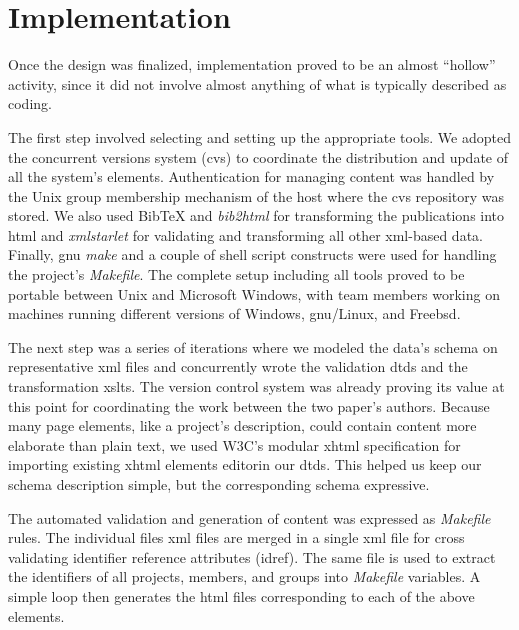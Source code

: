 \documentclass[10pt]{article}
\begin{document}
\section{Implementation}
Once the design was finalized,
implementation proved to be an almost ``hollow'' activity,
since it did not involve almost anything of what
is typically described as coding.

The first step involved selecting and setting up the
appropriate tools.
We adopted the concurrent versions system
({\sc cvs}) \cite{BF01} to coordinate the distribution
and update of all the system's elements.
Authentication for managing content was handled by the
Unix group membership mechanism of the host where the
{\sc cvs} repository was stored.
We also used
BibTeX and {\em bib2html} for transforming the publications
into {\sc html} and
{\em xmlstarlet} \cite{Gru04} for validating and transforming
all other {\sc xml}-based data.
Finally, {\sc gnu} {\em make} and a couple of shell script
constructs were used for handling the project's {\em Makefile}.
The complete setup including all tools proved to be portable
between Unix and Microsoft Windows, with team members working
on machines running different versions of Windows, {\sc gnu}/Linux,
and Free{\sc bsd}.

The next step was a series of iterations where we
modeled the data's schema on representative {\sc xml}
files and concurrently wrote the validation {\sc dtd}s
and the transformation {\sc xslt}s.
The version control system was already proving its value
at this point
for coordinating the work between the two paper's authors.
Because many page elements, like a project's description,
could contain content more elaborate than plain text,
we used W3C's modular {\sc xhtml} specification for
importing existing {\sc xhtml} elements editorin our {\sc dtd}s.
This helped us keep our schema description simple,
but the corresponding schema expressive.

The automated validation and generation of content was
expressed as {\em Makefile} rules.
The individual files {\sc xml} files are merged in a
single {\sc xml} file for cross validating identifier
reference attributes ({\sc idref}).
The same file is used to extract the identifiers of
all projects, members, and groups into {\em Makefile}
variables.
A simple loop then generates the {\sc html} files
corresponding to each of the above elements.
\end{document}

